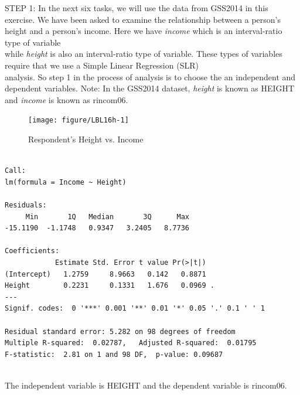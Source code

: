 \documentclass[11pt, chapterprefix=true]{scrbook}\usepackage[]{graphicx}\usepackage[]{color}
\begin{document}
\begin{exercises}
  \begin{exercise} %


    STEP 1: In the next six tasks, we will use the data from GSS2014 in this exercise.  We have been asked to examine the relationship between a person's height and a person's income.  Here we have {\textit{income}} which is an  interval-ratio type of variable \\ while {\textit{height}} is also an interval-ratio type of variable.  These types of variables require that we use a Simple Linear Regression (SLR) \\ analysis.  So step 1 in the process of analysis is to choose the an independent and dependent variables.  Note: In the GSS2014 dataset, {\textit{height}} is known as HEIGHT and {\textit{income}} is known as rincom06.

\begin{figure}[ht]

{\centering \texttt{[image: figure/LBL16h-1]} 

}

\caption[Respondent's Height vs]{Respondent's Height vs. Income}\label{fig:LBL16h}
\end{figure}



{\tiny{
  \begin{verbatim}

Call:
lm(formula = Income ~ Height)

Residuals:
     Min       1Q   Median       3Q      Max 
-15.1190  -1.1748   0.9347   3.2405   8.7736 

Coefficients:
            Estimate Std. Error t value Pr(>|t|)  
(Intercept)   1.2759     8.9663   0.142   0.8871  
Height        0.2231     0.1331   1.676   0.0969 .
---
Signif. codes:  0 '***' 0.001 '**' 0.01 '*' 0.05 '.' 0.1 ' ' 1

Residual standard error: 5.282 on 98 degrees of freedom
Multiple R-squared:  0.02787,	Adjusted R-squared:  0.01795 
F-statistic:  2.81 on 1 and 98 DF,  p-value: 0.09687


  \end{verbatim}
}}

    \vspace{5mm}

    \end{exercise}
    \vspace{2mm}
    \begin{solution}
       The independent variable is HEIGHT and the dependent variable is rincom06.
    \end{solution}


\end{exercises}
\end{document}
